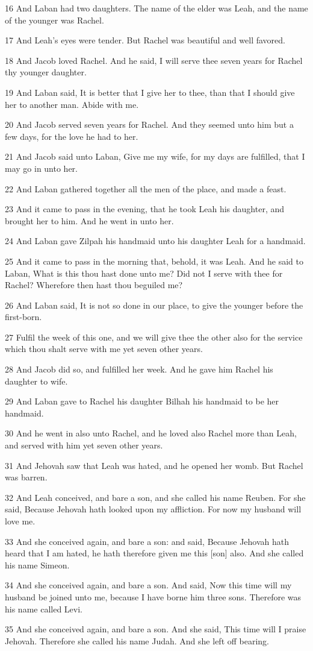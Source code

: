 \par 16 And Laban had two daughters. The name of the elder was Leah, and the name of the younger was Rachel.
\par 17 And Leah's eyes were tender. But Rachel was beautiful and well favored.
\par 18 And Jacob loved Rachel. And he said, I will serve thee seven years for Rachel thy younger daughter.
\par 19 And Laban said, It is better that I give her to thee, than that I should give her to another man. Abide with me.
\par 20 And Jacob served seven years for Rachel. And they seemed unto him but a few days, for the love he had to her.
\par 21 And Jacob said unto Laban, Give me my wife, for my days are fulfilled, that I may go in unto her.
\par 22 And Laban gathered together all the men of the place, and made a feast.
\par 23 And it came to pass in the evening, that he took Leah his daughter, and brought her to him. And he went in unto her.
\par 24 And Laban gave Zilpah his handmaid unto his daughter Leah for a handmaid.
\par 25 And it came to pass in the morning that, behold, it was Leah. And he said to Laban, What is this thou hast done unto me? Did not I serve with thee for Rachel? Wherefore then hast thou beguiled me?
\par 26 And Laban said, It is not so done in our place, to give the younger before the first-born.
\par 27 Fulfil the week of this one, and we will give thee the other also for the service which thou shalt serve with me yet seven other years.
\par 28 And Jacob did so, and fulfilled her week. And he gave him Rachel his daughter to wife.
\par 29 And Laban gave to Rachel his daughter Bilhah his handmaid to be her handmaid.
\par 30 And he went in also unto Rachel, and he loved also Rachel more than Leah, and served with him yet seven other years.
\par 31 And Jehovah saw that Leah was hated, and he opened her womb. But Rachel was barren.
\par 32 And Leah conceived, and bare a son, and she called his name Reuben. For she said, Because Jehovah hath looked upon my affliction. For now my husband will love me.
\par 33 And she conceived again, and bare a son: and said, Because Jehovah hath heard that I am hated, he hath therefore given me this [son] also. And she called his name Simeon.
\par 34 And she conceived again, and bare a son. And said, Now this time will my husband be joined unto me, because I have borne him three sons. Therefore was his name called Levi.
\par 35 And she conceived again, and bare a son. And she said, This time will I praise Jehovah. Therefore she called his name Judah. And she left off bearing.

